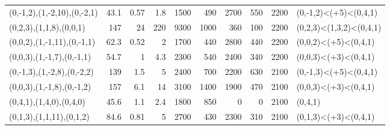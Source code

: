 \begin{tabular}{lrrrrrrrrl}
 (0,-1,2),(1,-2,10),(0,-2,1) &       43.1 &                              0.57 &                            1.8  &                              1500 &                             490 &                              2700 &                             550 &       2200 & (0,-1,2)<(+5)<(0,4,1)   \\
 (0,2,3),(1,1,8),(0,0,1)     &      147   &                             24    &                          220    &                              9300 &                            1000 &                               360 &                             100 &       2200 & (0,2,3)<(1,3,2)<(0,4,1) \\
 (0,0,2),(1,-1,11),(0,-1,1)  &       62.3 &                              0.52 &                            2    &                              1700 &                             440 &                              2800 &                             440 &       2200 & (0,0,2)<(+5)<(0,4,1)    \\
 (0,0,3),(1,-1,7),(0,-1,1)   &       54.7 &                              1    &                            4.3  &                              2300 &                             540 &                              2400 &                             340 &       2200 & (0,0,3)<(+3)<(0,4,1)    \\
 (0,-1,3),(1,-2,8),(0,-2,2)  &      139   &                              1.5  &                            5    &                              2400 &                             700 &                              2200 &                             630 &       2100 & (0,-1,3)<(+5)<(0,4,1)   \\
 (0,0,3),(1,-1,8),(0,-1,2)   &      157   &                              6.1  &                           14    &                              3100 &                            1400 &                              1900 &                             470 &       2100 & (0,0,3)<(+3)<(0,4,1)    \\
 (0,4,1),(1,4,0),(0,4,0)     &       45.6 &                              1.1  &                            2.4  &                              1800 &                             850 &                                 0 &                               0 &       2100 & (0,4,1)                 \\
 (0,1,3),(1,1,11),(0,1,2)    &       84.6 &                              0.81 &                            5    &                              2700 &                             430 &                              2300 &                             310 &       2100 & (0,1,3)<(+3)<(0,4,1)    \\

\end{tabular}

